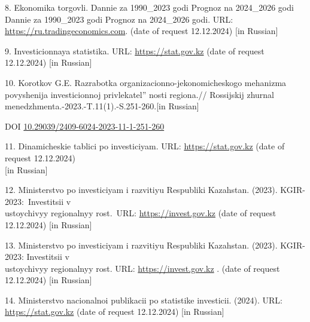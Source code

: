 \begin{references}
8. Ekonomika torgovli. Dannie za 1990\_2023 godi \textbar{} Prognoz na
2024\_2026 godi Dannie za 1990\_2023 godi \textbar{} Prognoz na
2024\_2026 godi. URL:
\href{https://ru.tradingeconomics.com/kazakhstan/gdp}{https://ru.tradingeconomics.com}. (date of request
12.12.2024) {[}in Russian{]}

9. Investicionnaya statistika. URL:
\href{https://stat.gov.kz/ru/industries/business-statistics/stat-invest/publications/5203/}{https://stat.gov.kz}
(date of request 12.12.2024) {[}in Russian{]}

10. Korotkov G.E. Razrabotka organizacionno-jekonomicheskogo mehanizma
povyshenija investicionnoj
privlekatel'' nosti regiona.// Rossijskij
zhurnal menedzhmenta.-2023.-T.11(1).-S.251-260.{[}in Russian{]}

DOI \href{https://doi.org/10.29039/2409-6024-2023-11-1-251-260}{10.29039/2409-6024-2023-11-1-251-260}

11. Dinamicheskie tablici po investiciyam. URL:
\href{https://stat.gov.kz/ru/industries/business-statistics/stat-invest/dynamic-tables/}{https://stat.gov.kz}
(date of request 12.12.2024) \\{[}in Russian{]}

12. Ministerstvo po investiciyam i razvitiyu Respubliki
Kazahstan. (2023). KGIR-2023:~Investitsii v \\ustoychivyy regionalnyy
rost.~URL:
\href{https://invest.gov.kz/ru/media-center/press-releases/kgir-2023-investitsii-v-ustoychivyy-regionalnyy-rost/}{https://invest.gov.kz}
(date of request 12.12.2024) {[}in Russian{]}

13. Ministerstvo po investiciyam i razvitiyu Respubliki Kazahstan.
(2023). KGIR-2023: Investitsii v \\ustoychivyy regionalnyy rost. URL:
\href{https://invest.gov.kz/ru/media-center/press-releases/kgir-2023-investitsii-v-ustoychivyy-regionalnyy-rost/2023}{https://invest.gov.kz}
. (date of request 12.12.2024) {[}in Russian{]}

14. Ministerstvo nacionalnoi publikacii po statistike investicii. (2024).
URL:
\href{https://stat.gov.kz/ru/industries/business-statistics/stat-invest/publications/182352/}{https://stat.gov.kz}
(date of request 12.12.2024) {[}in Russian{]}
\end{references}

